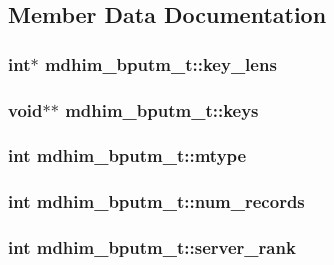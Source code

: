 \subsection{Member Data Documentation}
\hypertarget{structmdhim__bputm__t_a528ae69dc41eab9b8e8d523d67debeac}{
\subsubsection[{key\-\_\-lens}]{\setlength{\rightskip}{0pt plus 5cm}int$\ast$ mdhim\-\_\-bputm\-\_\-t\-::key\-\_\-lens}}\label{structmdhim__bputm__t_a528ae69dc41eab9b8e8d523d67debeac}
\hypertarget{structmdhim__bputm__t_a6cd17a8565bb662fdb1d52d878ce2a3d}{
\subsubsection[{keys}]{\setlength{\rightskip}{0pt plus 5cm}void$\ast$$\ast$ mdhim\-\_\-bputm\-\_\-t\-::keys}}\label{structmdhim__bputm__t_a6cd17a8565bb662fdb1d52d878ce2a3d}
\hypertarget{structmdhim__bputm__t_a84865663becc6cfd06c5c7667b37244d}{
\subsubsection[{mtype}]{\setlength{\rightskip}{0pt plus 5cm}int mdhim\-\_\-bputm\-\_\-t\-::mtype}}\label{structmdhim__bputm__t_a84865663becc6cfd06c5c7667b37244d}
\hypertarget{structmdhim__bputm__t_ad075b00254b3f26231b57134995d017b}{
\subsubsection[{num\-\_\-records}]{\setlength{\rightskip}{0pt plus 5cm}int mdhim\-\_\-bputm\-\_\-t\-::num\-\_\-records}}\label{structmdhim__bputm__t_ad075b00254b3f26231b57134995d017b}
\hypertarget{structmdhim__bputm__t_afd28a1e8797725473429ebed5ccc6800}{
\subsubsection[{server\-\_\-rank}]{\setlength{\rightskip}{0pt plus 5cm}int mdhim\-\_\-bputm\-\_\-t\-::server\-\_\-rank}}\label{structmdhim__bputm__t_afd28a1e8797725473429ebed5ccc6800}
